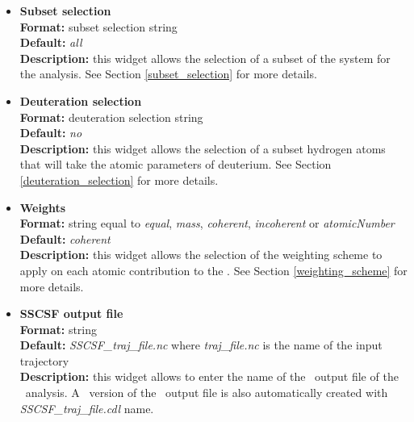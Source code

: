 \documentclass[a4paper,11pt]{report}
\newcommand{\qshells}{\textit{q}-shells}
\begin{document}
\begin{itemize}
For example,
\begin{itemize}
\item \textit{0:10:1} will generate \qshells\ of radii 0, 1, 2, 3, 4, 5, 6, 7, 8, 9, 10.
\item \textit{3:12:2} will generate \qshells\ of radii 3, 5, 7, 9, 11.
\end{itemize}

\item \textbf{Subset selection}\\
\textbf{Format:} subset selection string\\
\textbf{Default:} \textit{all}\\
\textbf{Description:} this widget allows the selection of a subset of the system for the analysis. 
See Section \ref{subset_selection} for more details.

\item \textbf{Deuteration selection}\\
\textbf{Format:} deuteration selection string\\
\textbf{Default:} \textit{no}\\
\textbf{Description:} this widget allows the selection of a subset hydrogen atoms that will take the atomic parameters 
of deuterium. See Section \ref{deuteration_selection} for more details.

\item \textbf{Weights}\\
\textbf{Format:} string equal to \textit{equal}, \textit{mass}, \textit{coherent}, \textit{incoherent} or \textit{atomicNumber}\\
\textbf{Default:} \textit{coherent}\\
\textbf{Description:} this widget allows the selection of the weighting scheme to apply on each atomic contribution 
to the \SSCSF . See Section \ref{weighting_scheme} for more details. 

\item \textbf{SSCSF output file}\\
\textbf{Format:} string\\
\textbf{Default:} \textit{SSCSF\_traj\_file.nc} where \textit{traj\_file.nc} is the name of the input trajectory\\
\textbf{Description:} this widget allows to enter the name of the \NetCDF\ output file of the \SSCSF\ analysis. A \CDL\ 
version of the \NetCDF\ output file is also automatically created with \textit{SSCSF\_traj\_file.cdl} name.
\end{itemize}
\end{document}
